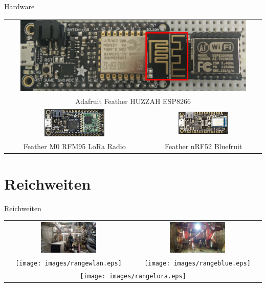 \documentclass[18pt]{beamer}
\begin{document}
\begin{frame}{Hardware}
	\begin{tabular}{cc}
		\multicolumn{2}{c}{\includegraphics[width=0.9\textwidth]{images/espmodules.png}}\\
		\multicolumn{2}{c}{Adafruit Feather HUZZAH ESP8266}\\
		\includegraphics[width=0.45\textwidth]{images/loraada.png} & \includegraphics[width=0.45\textwidth]{images/nrf52ada.png}\\
		Feather M0 RFM95 LoRa Radio & Feather nRF52 Bluefruit\\
	\end{tabular}
\end{frame}

\section{Reichweiten}
\begin{frame}{Reichweiten}
	\begin{tabular}{cc}
		\includegraphics[width=0.45\textwidth]{images/tunnel.jpg} & \includegraphics[width=0.45\textwidth]{images/schalungswagen.jpg}\\
		\texttt{[image: images/rangewlan.eps]} & \texttt{[image: images/rangeblue.eps]} \\
		\multicolumn{2}{c}{\texttt{[image: images/rangelora.eps]}}\\
	\end{tabular}
\end{frame}
\end{document}
